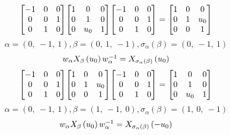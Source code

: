 \documentclass[11pt]{article}
\theoremstyle{definition}
\begin{document}
\[
\scaletoalign{\textwidth}{{\left[\begin{matrix}-1 & 0 & 0\\0 & 0 & 1\\0 & 1 & 0\end{matrix}\right]} {\left[\begin{matrix}1 & 0 & 0\\0 & 1 & 0\\0 & u_{0} & 1\end{matrix}\right]} {\left[\begin{matrix}-1 & 0 & 0\\0 & 0 & 1\\0 & 1 & 0\end{matrix}\right]} = {\left[\begin{matrix}1 & 0 & 0\\0 & 1 & u_{0}\\0 & 0 & 1\end{matrix}\right]}}
\]
\[
\alpha = \left( 0, \  -1, \  1\right), \beta = \left( 0, \  1, \  -1\right), \sigma_{\alpha}(\beta) = \left( 0, \  -1, \  1\right)
\]
\[
\scaletoalign{\textwidth}{w_{\alpha} X_{\beta}\left(u_{0}\right) w_{\alpha}^{-1} = X_{\sigma_{\alpha}\left(\beta\right)}\left(u_{0}\right)}
\]
\[
\scaletoalign{\textwidth}{{\left[\begin{matrix}-1 & 0 & 0\\0 & 0 & 1\\0 & 1 & 0\end{matrix}\right]} {\left[\begin{matrix}1 & 0 & 0\\0 & 1 & u_{0}\\0 & 0 & 1\end{matrix}\right]} {\left[\begin{matrix}-1 & 0 & 0\\0 & 0 & 1\\0 & 1 & 0\end{matrix}\right]} = {\left[\begin{matrix}1 & 0 & 0\\0 & 1 & 0\\0 & u_{0} & 1\end{matrix}\right]}}
\]
\[
\alpha = \left( 0, \  -1, \  1\right), \beta = \left( 1, \  -1, \  0\right), \sigma_{\alpha}(\beta) = \left( 1, \  0, \  -1\right)
\]
\[
\scaletoalign{\textwidth}{w_{\alpha} X_{\beta}\left(u_{0}\right) w_{\alpha}^{-1} = X_{\sigma_{\alpha}\left(\beta\right)}\left(- u_{0}\right)}
\]
\end{document}
